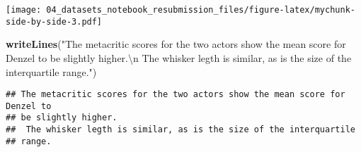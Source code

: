 \documentclass[
]{article}
\newenvironment{Shaded}{\begin{snugshade}}{\end{snugshade}}
\newcommand{\CharTok}[1]{\textcolor[rgb]{0.31,0.60,0.02}{#1}}
\newcommand{\KeywordTok}[1]{\textcolor[rgb]{0.13,0.29,0.53}{\textbf{#1}}}
\newcommand{\NormalTok}[1]{#1}
\newcommand{\StringTok}[1]{\textcolor[rgb]{0.31,0.60,0.02}{#1}}
\begin{document}
\texttt{[image: 04\_datasets\_notebook\_resubmission\_files/figure-latex/mychunk-side-by-side-3.pdf]}

\begin{Shaded}
\begin{Highlighting}[]
\KeywordTok{writeLines}\NormalTok{(}\StringTok{"The metacritic scores for the two actors show the mean score for Denzel to }
\StringTok{be slightly higher.}\CharTok{\textbackslash{}n}\StringTok{ The whisker legth is similar, as is the size of the interquartile }
\StringTok{range."}\NormalTok{)}
\end{Highlighting}
\end{Shaded}

\begin{verbatim}
## The metacritic scores for the two actors show the mean score for Denzel to 
## be slightly higher.
##  The whisker legth is similar, as is the size of the interquartile 
## range.
\end{verbatim}
\end{document}
